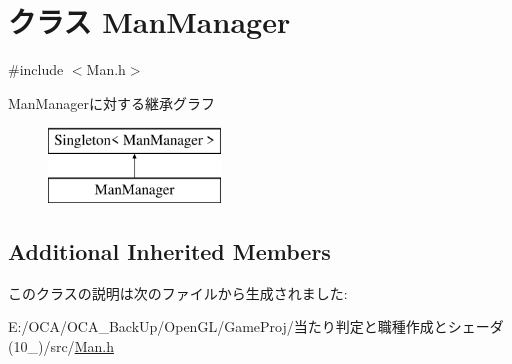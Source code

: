 \hypertarget{class_man_manager}{\section{クラス Man\-Manager}
\label{class_man_manager}
}


{\ttfamily \#include $<$Man.\-h$>$}

Man\-Managerに対する継承グラフ\begin{figure}[H]
\begin{center}
\leavevmode
\includegraphics[height=2.000000cm]{d6/dcd/class_man_manager}
\end{center}
\end{figure}
\subsection*{Additional Inherited Members}


このクラスの説明は次のファイルから生成されました\-:\begin{DoxyCompactItemize}
\item 
E\-:/\-O\-C\-A/\-O\-C\-A\-\_\-\-Back\-Up/\-Open\-G\-L/\-Game\-Proj/当たり判定と職種作成とシェーダ(10\-\_)/src/\hyperlink{_man_8h}{Man.\-h}\end{DoxyCompactItemize}
